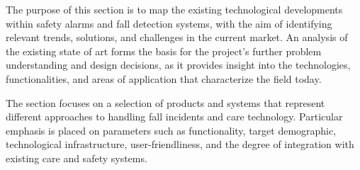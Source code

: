 The purpose of this section is to map the existing technological developments within safety alarms and fall detection systems, with the aim of identifying relevant trends, solutions, and challenges in the current market. An analysis of the existing state of art forms the basis for the project’s further problem understanding and design decisions, as it provides insight into the technologies, functionalities, and areas of application that characterize the field today.

The section focuses on a selection of products and systems that represent different approaches to handling fall incidents and care technology. Particular emphasis is placed on parameters such as functionality, target demographic, technological infrastructure, user-friendliness, and the degree of integration with existing care and safety systems.

